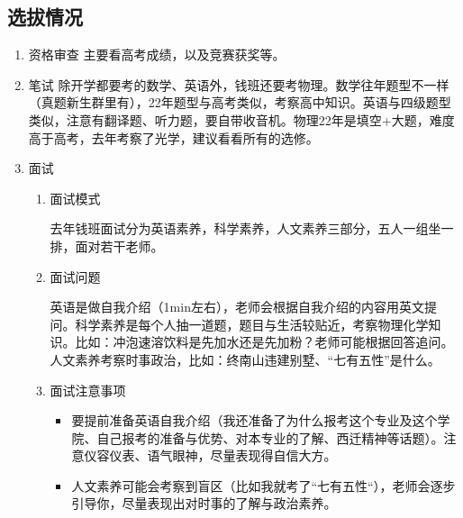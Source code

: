 \documentclass[zihao=-4,fontset=none]{Beautybook-CN}
\begin{document}
\subsection{选拔情况} 
\begin{enumerate}
	\item 资格审查
	      主要看高考成绩，以及竞赛获奖等。
	\item 笔试
	      除开学都要考的数学、英语外，钱班还要考物理。数学往年题型不一样（真题新生群里有），22年题型与高考类似，考察高中知识。英语与四级题型类似，注意有翻译题、听力题，要自带收音机。物理22年是填空+大题，难度高于高考，去年考察了光学，建议看看所有的选修。
	      	      	      
	\item 面试
	      \begin{enumerate}
	      	\item 面试模式
	      	      	      	      	      	          
	      	      去年钱班面试分为英语素养，科学素养，人文素养三部分，五人一组坐一排，面对若干老师。
	      	      	      	      	      	          
	      	\item 面试问题
	      	      	      	      	      	          
	      	      英语是做自我介绍（1min左右），老师会根据自我介绍的内容用英文提问。科学素养是每个人抽一道题，题目与生活较贴近，考察物理化学知识。比如：冲泡速溶饮料是先加水还是先加粉？老师可能根据回答追问。人文素养考察时事政治，比如：终南山违建别墅、“七有五性”是什么。
	      	      	      	      	      	          
	      	\item 面试注意事项
	      	      \begin{itemize}
	      	      	\item 要提前准备英语自我介绍（我还准备了为什么报考这个专业及这个学院、自己报考的准备与优势、对本专业的了解、西迁精神等话题）。注意仪容仪表、语气眼神，尽量表现得自信大方。
	      	      	\item 人文素养可能会考察到盲区（比如我就考了“七有五性“），老师会逐步引导你，尽量表现出对时事的了解与政治素养。
	      	      \end{itemize}
	      \end{enumerate}    
	      	      	      

\end{enumerate}
\end{document}
